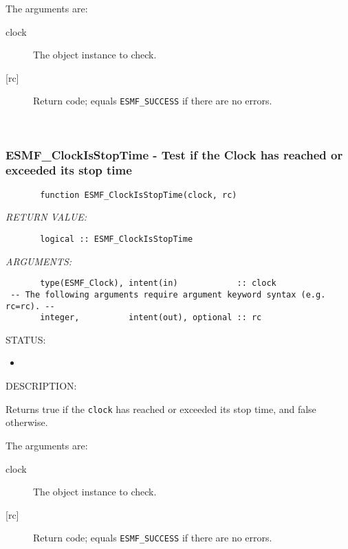        The arguments are:
       \begin{description}
       \item[clock]
            The object instance to check.
       \item[{[rc]}]
            Return code; equals {\tt ESMF\_SUCCESS} if there are no errors.
       \end{description} 
 
\mbox{}\hrulefill\ 
 
\subsubsection [ESMF\_ClockIsStopTime] {ESMF\_ClockIsStopTime - Test if the Clock has reached or exceeded its stop time}


 
\begin{verbatim}       function ESMF_ClockIsStopTime(clock, rc)\end{verbatim}{\em RETURN VALUE:}
\begin{verbatim}       logical :: ESMF_ClockIsStopTime
 \end{verbatim}{\em ARGUMENTS:}
\begin{verbatim}       type(ESMF_Clock), intent(in)            :: clock
 -- The following arguments require argument keyword syntax (e.g. rc=rc). --
       integer,          intent(out), optional :: rc
 \end{verbatim}
{\sf STATUS:}
   \begin{itemize}
   \item{}
   \end{itemize}
  
{\sf DESCRIPTION:\\ }


       Returns true if the {\tt clock} has reached or exceeded its stop time,
       and false otherwise.
  
       The arguments are:
       \begin{description}
       \item[clock]
            The object instance to check.
       \item[{[rc]}]
            Return code; equals {\tt ESMF\_SUCCESS} if there are no errors.
       \end{description} 
 
